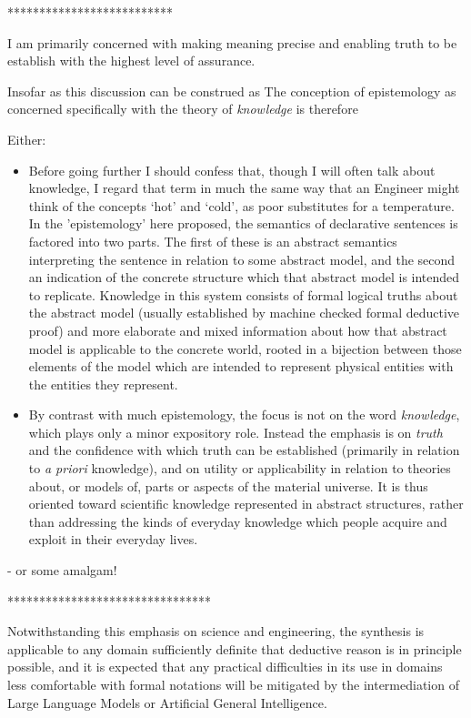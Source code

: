 \documentclass[10pt,titlepage]{book}
\begin{document}
**************************


I am primarily concerned with making meaning precise and enabling truth to be establish with the highest level of assurance.

Insofar as this discussion can be construed as 
The conception of epistemology as concerned specifically with the theory of \emph{knowledge} is therefore 

Either:
\begin{itemize}
  \item
Before going further I should confess that, though I will often talk about knowledge, I regard that term in much the same way that an Engineer might think of the concepts `hot' and `cold', as poor substitutes for a temperature.
In the 'epistemology' here proposed, the semantics of declarative sentences is factored into two parts.
The first of these is an abstract semantics interpreting the sentence in relation to some abstract model, and the second an indication of the concrete structure which that abstract model is intended to replicate.
Knowledge in this system consists of formal logical truths about the abstract model (usually established by machine checked formal deductive proof) and more elaborate and mixed information about how that abstract model is applicable to the concrete world, rooted in a bijection between those elements of the model which are intended to represent physical entities with the entities they represent.
\item
By contrast with much epistemology, the focus is not on the word \emph{knowledge}, which plays only a minor expository role.
Instead the emphasis is on \emph{truth} and the confidence with which truth can be established (primarily in relation to \emph{a priori} knowledge), and on utility or applicability in relation to theories about, or models of, parts or aspects of the material universe.
It is thus oriented toward scientific knowledge represented in abstract structures, rather than addressing the kinds of everyday knowledge which people acquire and exploit in their everyday lives.
\end{itemize}
- or some amalgam!


********************************

Notwithstanding this emphasis on science and engineering, the synthesis is applicable to any domain sufficiently definite that deductive reason is in principle possible, and it is expected that any practical difficulties in its use in domains less comfortable with formal notations will be mitigated by the intermediation of Large Language Models or Artificial General Intelligence.
\end{document}
